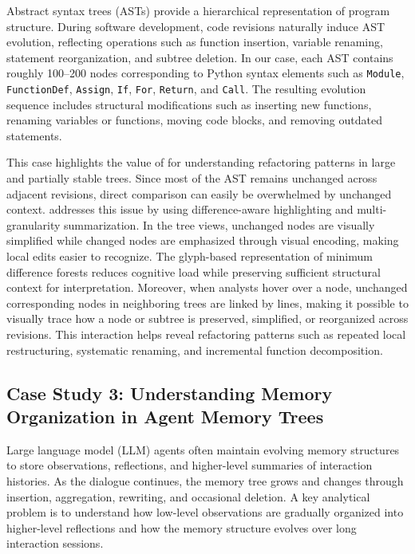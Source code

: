 Abstract syntax trees (ASTs) provide a hierarchical representation of program structure. During software development, code revisions naturally induce AST evolution, reflecting operations such as function insertion, variable renaming, statement reorganization, and subtree deletion. In our case, each AST contains roughly 100--200 nodes corresponding to Python syntax elements such as \texttt{Module}, \texttt{FunctionDef}, \texttt{Assign}, \texttt{If}, \texttt{For}, \texttt{Return}, and \texttt{Call}. The resulting evolution sequence includes structural modifications such as inserting new functions, renaming variables or functions, moving code blocks, and removing outdated statements.

This case highlights the value of \sysname{} for understanding refactoring patterns in large and partially stable trees. Since most of the AST remains unchanged across adjacent revisions, direct comparison can easily be overwhelmed by unchanged context. \sysname{} addresses this issue by using difference-aware highlighting and multi-granularity summarization. In the tree views, unchanged nodes are visually simplified while changed nodes are emphasized through visual encoding, making local edits easier to recognize. The glyph-based representation of minimum difference forests reduces cognitive load while preserving sufficient structural context for interpretation. Moreover, when analysts hover over a node, unchanged corresponding nodes in neighboring trees are linked by lines, making it possible to visually trace how a node or subtree is preserved, simplified, or reorganized across revisions. This interaction helps reveal refactoring patterns such as repeated local restructuring, systematic renaming, and incremental function decomposition.

\subsection{Case Study 3: Understanding Memory Organization in Agent Memory Trees}

Large language model (LLM) agents often maintain evolving memory structures to store observations, reflections, and higher-level summaries of interaction histories. As the dialogue continues, the memory tree grows and changes through insertion, aggregation, rewriting, and occasional deletion. A key analytical problem is to understand how low-level observations are gradually organized into higher-level reflections and how the memory structure evolves over long interaction sessions.

